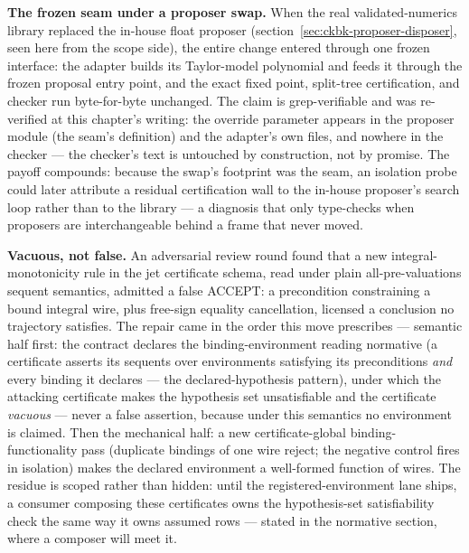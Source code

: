 \textbf{The frozen seam under a proposer swap.} When the real
validated-numerics library replaced the in-house float proposer
(section~\ref{sec:ckbk-proposer-disposer}, seen here from the scope
side), the entire change entered through one frozen interface: the
adapter builds its Taylor-model polynomial and feeds it through the
frozen proposal entry point, and the exact fixed point, split-tree
certification, and checker run byte-for-byte unchanged. The claim is
grep-verifiable and was re-verified at this chapter's writing: the
override parameter appears in the proposer module (the seam's
definition) and the adapter's own files, and nowhere in the checker ---
the checker's text is untouched by construction, not by promise. The
payoff compounds: because the swap's footprint was the seam, an
isolation probe could later attribute a residual certification wall to
the in-house proposer's search loop rather than to the library --- a
diagnosis that only type-checks when proposers are interchangeable
behind a frame that never moved.

\textbf{Vacuous, not false.} An adversarial review round found that a
new integral-monotonicity rule in the jet certificate schema, read
under plain all-pre-valuations sequent semantics, admitted a false
ACCEPT: a precondition constraining a bound integral wire, plus
free-sign equality cancellation, licensed a conclusion no trajectory
satisfies. The repair came in the order this move prescribes ---
semantic half first: the contract declares the binding-environment
reading normative (a certificate asserts its sequents over environments
satisfying its preconditions \emph{and} every binding it declares ---
the declared-hypothesis pattern), under which the attacking certificate
makes the hypothesis set unsatisfiable and the certificate
\emph{vacuous} --- never a false assertion, because under this
semantics no environment is claimed. Then the mechanical half: a new
certificate-global binding-functionality pass (duplicate bindings of
one wire reject; the negative control fires in isolation) makes the
declared environment a well-formed function of wires. The residue is
scoped rather than hidden: until the registered-environment lane ships,
a consumer composing these certificates owns the hypothesis-set
satisfiability check the same way it owns assumed rows --- stated in
the normative section, where a composer will meet it.

